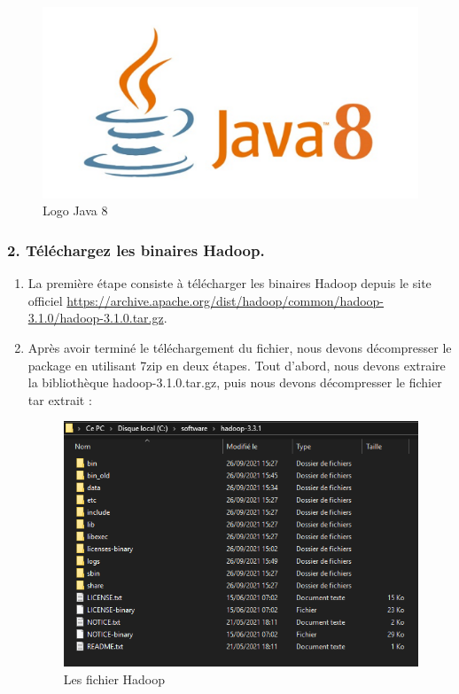 \begin{figure}[h]
	\centering
    \includegraphics[scale=0.6]{img/part3/1.3}
    \caption{Logo Java 8}
\end{figure}

\newpage
\subsubsection{2. Téléchargez les binaires Hadoop.}

\begin{enumerate}
\item La première étape consiste à télécharger les binaires Hadoop depuis le site officiel \url{https://archive.apache.org/dist/hadoop/common/hadoop-3.1.0/hadoop-3.1.0.tar.gz}.

\item Après avoir terminé le téléchargement du fichier, nous devons décompresser le package en utilisant 7zip en deux étapes. Tout d'abord, nous devons extraire la bibliothèque hadoop-3.1.0.tar.gz, puis nous devons décompresser le fichier tar extrait :
\begin{figure}[h]
	\centering
    \includegraphics[scale=0.5]{img/part3/1.4}
    \caption{Les fichier Hadoop}
\end{figure}

\end{enumerate}

